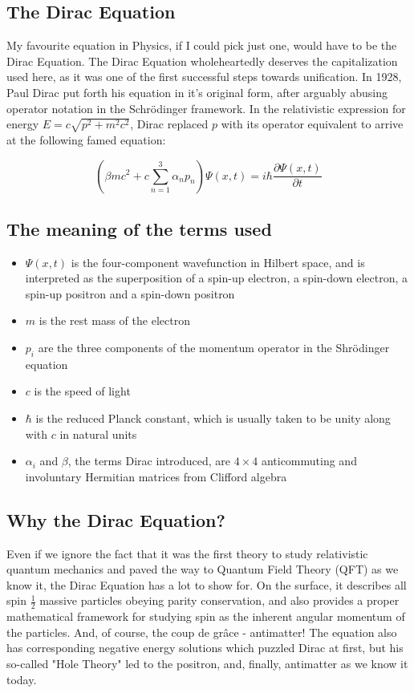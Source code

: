 \subsection{The Dirac Equation}
{
    My favourite equation in Physics, if I could pick just one, would have to be the Dirac Equation. The Dirac Equation wholeheartedly deserves the capitalization used here, as it was one of the first successful steps towards unification. In 1928, Paul Dirac put forth his equation in it's original form, after arguably abusing operator notation in the Schr{\"o}dinger framework. In the relativistic expression for energy $E=c\sqrt{p^2 + m^2 c^2}$, Dirac replaced $p$ with its operator equivalent to arrive at the following famed equation:

    \begin{equation}
        (\beta m c^2 + c \sum_{n=1}^3 \alpha_n p_n) \Psi(x,t) = i \hbar \frac{\partial \Psi(x,t)}{\partial t}
        \label{The Dirac Equation}
    \end{equation}
}

\subsection{The meaning of the terms used}
{
    \begin{itemize}
        \item $\Psi(x,t)$ is the four-component wavefunction in Hilbert space, and is interpreted as the superposition of a spin-up electron, a spin-down electron, a spin-up positron and a spin-down positron
        \item $m$ is the rest mass of the electron
        \item $p_i$ are the three components of the momentum operator in the Shr{\"o}dinger equation
        \item $c$ is the speed of light
        \item $\hbar$ is the reduced Planck constant, which is usually taken to be unity along with $c$ in natural units
        \item $\alpha_i$ and $\beta$, the terms Dirac introduced, are $4 \times 4$ anticommuting and involuntary Hermitian matrices from Clifford algebra 
    \end{itemize}
}

\subsection{Why the Dirac Equation?}
{
    Even if we ignore the fact that it was the first theory to study relativistic quantum mechanics and paved the way to Quantum Field Theory (QFT) as we know it, the Dirac Equation has a lot to show for. On the surface, it describes all spin $\frac{1}{2}$ massive particles obeying parity conservation, and also provides a proper mathematical framework for studying spin as the inherent angular momentum of the particles. And, of course, the coup de gr{\^a}ce - antimatter! The equation also has corresponding negative energy solutions which puzzled Dirac at first, but his so-called "Hole Theory" led to the positron, and, finally, antimatter as we know it today.
}
